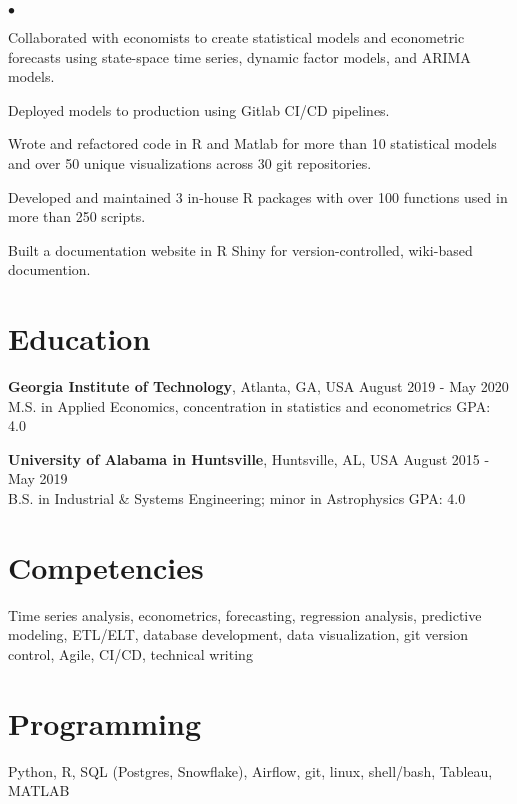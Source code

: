 \documentclass[margin, line]{res}
\newenvironment{list2}{
  \begin{list}{$\bullet$}{%
      \setlength{\itemsep}{0.04in}
      \setlength{\parsep}{0in} \setlength{\parskip}{0in}
      \setlength{\topsep}{0.05in} \setlength{\partopsep}{0in} 
      \setlength{\leftmargin}{\dimexpr 26pt-0.05in}}}
    {\end{list}}
\begin{document}
\begin{resume}
    \begin{list2}
        \item Collaborated with economists to create statistical models and econometric forecasts using state-space time series, dynamic factor models, and ARIMA models.
        \item Deployed models to production using Gitlab CI/CD pipelines.
        \item Wrote and refactored code in R and Matlab for more than 10 statistical models and over 50 unique visualizations across 30 git repositories. 
        \item Developed and maintained 3 in-house R packages with over 100 functions used in more than 250 scripts.
        \item Built a documentation website in R Shiny for version-controlled, wiki-based documention.
    \end{list2}


\section{\sc Education }

{\bf Georgia Institute of Technology}, Atlanta, GA, USA \hfill August 2019 - May 2020\\
M.S. in Applied Economics, concentration in statistics and econometrics \hfill GPA: 4.0


{\bf University of Alabama in Huntsville}, Huntsville, AL, USA \hfill August 2015 - May 2019 \\
B.S. in Industrial \& Systems Engineering; minor in Astrophysics \hfill GPA: 4.0

\section{\sc Competencies} 
Time series analysis, econometrics, forecasting, regression analysis, predictive modeling, ETL/ELT, database development, data visualization, git version control, Agile, CI/CD, technical writing

\section{\sc Programming} 
Python, R, SQL (Postgres, Snowflake), Airflow, git, linux, shell/bash, Tableau, MATLAB

\end{resume}
\end{document}
